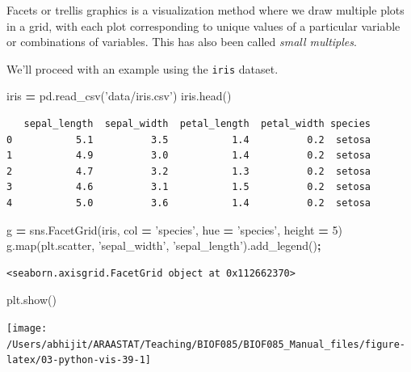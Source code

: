 \documentclass[
  letterpaper,
]{scrbook}
\newenvironment{Shaded}{\begin{snugshade}}{\end{snugshade}}
\newcommand{\BuiltInTok}[1]{#1}
\newcommand{\DecValTok}[1]{\textcolor[rgb]{0.00,0.00,0.81}{#1}}
\newcommand{\NormalTok}[1]{#1}
\newcommand{\OperatorTok}[1]{\textcolor[rgb]{0.81,0.36,0.00}{\textbf{#1}}}
\newcommand{\StringTok}[1]{\textcolor[rgb]{0.31,0.60,0.02}{#1}}
\begin{document}
Facets or trellis graphics is a visualization method where we draw multiple plots in a grid, with each plot corresponding to unique values of a particular variable or combinations of variables. This has also been called \emph{small multiples}.

We'll proceed with an example using the \texttt{iris} dataset.

\begin{Shaded}
\begin{Highlighting}[]
\NormalTok{iris }\OperatorTok{=}\NormalTok{ pd.read_csv(}\StringTok{'data/iris.csv'}\NormalTok{)}
\NormalTok{iris.head()}
\end{Highlighting}
\end{Shaded}

\begin{verbatim}
   sepal_length  sepal_width  petal_length  petal_width species
0           5.1          3.5           1.4          0.2  setosa
1           4.9          3.0           1.4          0.2  setosa
2           4.7          3.2           1.3          0.2  setosa
3           4.6          3.1           1.5          0.2  setosa
4           5.0          3.6           1.4          0.2  setosa
\end{verbatim}

\begin{Shaded}
\begin{Highlighting}[]
\NormalTok{g }\OperatorTok{=}\NormalTok{ sns.FacetGrid(iris, col }\OperatorTok{=} \StringTok{'species'}\NormalTok{, hue }\OperatorTok{=} \StringTok{'species'}\NormalTok{, height }\OperatorTok{=} \DecValTok{5}\NormalTok{)}
\NormalTok{g.}\BuiltInTok{map}\NormalTok{(plt.scatter, }\StringTok{'sepal_width'}\NormalTok{, }\StringTok{'sepal_length'}\NormalTok{).add_legend()}\OperatorTok{;}
\end{Highlighting}
\end{Shaded}

\begin{verbatim}
<seaborn.axisgrid.FacetGrid object at 0x112662370>
\end{verbatim}

\begin{Shaded}
\begin{Highlighting}[]
\NormalTok{plt.show()}
\end{Highlighting}
\end{Shaded}

\begin{center}\texttt{[image: /Users/abhijit/ARAASTAT/Teaching/BIOF085/BIOF085\_Manual\_files/figure-latex/03-python-vis-39-1]} \end{center}
\end{document}
